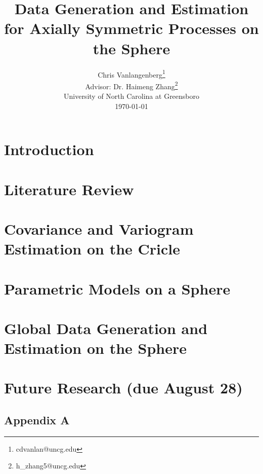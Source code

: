 

\usepackage{Sweave}




\title{{\bf\Large Data Generation and Estimation for Axially Symmetric Processes on the Sphere }}


\author{Chris Vanlangenberg\footnote{cdvanlan@uncg.edu} \\
\bigskip
Advisor: Dr. Haimeng Zhang\footnote{h\_zhang5@uncg.edu}\\ \small{University of North Carolina at Greensboro}\\
\small \today}

\maketitle 
\thispagestyle{empty}



\newpage
\chapter{Introduction}


\chapter{Literature Review}
%


\chapter{Covariance and Variogram Estimation on the Cricle}


\chapter{Parametric Models on a Sphere}


\chapter{Global Data Generation and Estimation on the Sphere}


\chapter{Future Research (due August 28)}




\section*{\centering Appendix A } \label{appendixA}



